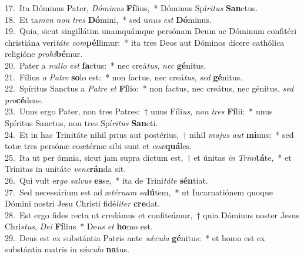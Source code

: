 {17.~}Ita Dóminus Pater, \textit{Dó}\textit{mi}\textit{nus} \textbf{Fí}lius,~* Dóminus Spí\textit{ri}\textit{tus} \textbf{San}ctus.\\
{18.~}Et ta\textit{men} \textit{non} \textit{tres} \textbf{Dó}mini,~* sed u\textit{nus} \textit{est} \textbf{Dó}minus.\\
{19.~}Quia, sicut singillátim unamquámque persónam Deum ac Dóminum confitéri christiána veri\textit{tá}\textit{te} \textit{com}\textbf{pél}limur:~* ita tres Deos aut Dóminos dícere cathólica religióne \textit{pro}\textit{hi}\textbf{bé}mur.\\
{20.~}Pater a \textit{nul}\textit{lo} \textit{est} \textbf{fa}ctus:~* nec creá\textit{tus}, \textit{nec} \textbf{gé}nitus.\\
{21.~}Fílius \textit{a} \textit{Pa}\textit{tre} \textbf{so}lo est:~* non factus, nec creá\textit{tus}, \textit{sed} \textbf{gé}nitus.\\
{22.~}Spíritus Sanctus a \textit{Pa}\textit{tre} \textit{et} \textbf{Fí}lio:~* non factus, nec creátus, nec génitus, \textit{sed} \textit{pro}\textbf{cé}dens.\\
{23.~}Unus ergo Pater, non tres Patres:~† unus Fíli\textit{us}, \textit{non} \textit{tres} \textbf{Fí}lii:~* unus Spíritus Sanctus, non tres Spí\textit{ri}\textit{tus} \textbf{San}cti.\\
{24.~}Et in hac Trinitáte nihil prius aut postérius,~† nihil \textit{ma}\textit{jus} \textit{aut} \textbf{mi}nus:~* sed totæ tres persónæ coætérnæ sibi sunt et \textit{co}\textit{æ}\textbf{quá}les.\\
{25.~}Ita ut per ómnia, sicut jam supra dictum est,~† et únitas \textit{in} \textit{Tri}\textit{ni}\textbf{tá}te,~* et Trínitas in unitáte \textit{ve}\textit{ne}\textbf{rán}da sit.\\
{26.~}Qui vult er\textit{go} \textit{sal}\textit{vus} \textbf{es}se,~* ita de Trini\textit{tá}\textit{te} \textbf{sén}tiat.\\
{27.~}Sed necessárium est ad æ\textit{tér}\textit{nam} \textit{sa}\textbf{lú}tem,~* ut Incarnatiónem quoque Dómini nostri Jesu Christi fidé\textit{li}\textit{ter} \textbf{cre}dat.\\
{28.~}Est ergo fides recta ut credámus et confiteámur,~† quia Dóminus noster Jesus Chri\textit{stus}, \textit{De}\textit{i} \textbf{Fí}lius~* De\textit{us} \textit{et} \textbf{ho}mo est.\\
{29.~}Deus est ex substántia Patris ante \textit{sǽ}\textit{cu}\textit{la} \textbf{gé}nitus:~* et homo est ex substántia matris in sǽ\textit{cu}\textit{lo} \textbf{na}tus.\\
